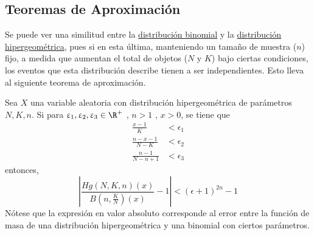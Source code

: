 \subsection{Teoremas de Aproximación}
Se puede ver una similitud entre la \hyperref[dist:binom]{distribución binomial}
y la \hyperref[dist:hip]{distribución hipergeométrica}, pues si en esta última, manteniendo
un tamaño de muestra ($n$) fijo, a medida que aumentan el total de objetos ($N$ y $K$) bajo
ciertas condiciones, los eventos que esta distribución describe tienen a ser independientes.
Esto lleva al siguiente teorema de aproximación.

\begin{Teo}
  Sea $X$ una variable aleatoria con distribución hipergeométrica de
  parámetros $N,K,n$. Si para $\epsilon_1,\epsilon_2,\epsilon_3\in\R^+$ , $n > 1$ , $x > 0$,
  se tiene que
  \begin{align*}
    \frac{x-1}{K}         &< \epsilon_1\\
    \frac{n-x-1}{N-K}     &< \epsilon_2\\
    \frac{n-1}{N - n + 1} &< \epsilon_3
  \end{align*}
  entonces,
  \[
    \left|\dfrac{Hg(N,K,n)(x)}{B\left(n,\frac{K}{N}\right)(x)} - 1\right| 
    < (\epsilon + 1)^{2n} - 1
  \]
  Nótese que la expresión en valor absoluto corresponde al error entre la
  función de masa de una distribución hipergeométrica y una binomial con ciertos
  parámetros.
\end{Teo}

